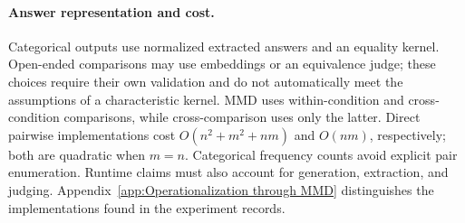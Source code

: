 \documentclass[11pt]{article}
\theoremstyle{plain}
\theoremstyle{definition}
\theoremstyle{remark}
\newif\ifrevisionmarkup
\DeclareRobustCommand{\revisioncolor}{\ifrevisionmarkup\color{red}\fi}
\newenvironment{revision}{\par\begingroup\revisioncolor}{\par\endgroup}
\begin{document}
\begin{revision}
\paragraph{Answer representation and cost.}
Categorical outputs use normalized extracted answers and an equality kernel. Open-ended comparisons may use embeddings or an equivalence judge; these choices require their own validation and do not automatically meet the assumptions of a characteristic kernel. MMD uses within-condition and cross-condition comparisons, while cross-comparison uses only the latter. Direct pairwise implementations cost $O(n^2+m^2+nm)$ and $O(nm)$, respectively; both are quadratic when $m=n$. Categorical frequency counts avoid explicit pair enumeration. Runtime claims must also account for generation, extraction, and judging. Appendix~\ref{app:Operationalization through MMD} distinguishes the implementations found in the experiment records.
\end{revision}
\end{document}
